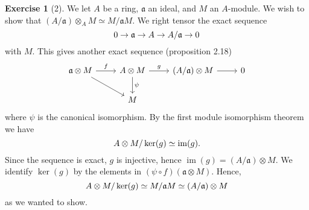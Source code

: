 \documentclass{article}
\theoremstyle{definition}
\newtheorem*{exercise}{Exercise}
\DeclareMathOperator{\im}{im}
\begin{document}
\begin{exercise}[2]
    We let $A$ be a ring, $\mathfrak{a}$ an ideal, and $M$ an $A$-module. We
    wish to show that $(A / \mathfrak{a}) \otimes_A M \simeq M /
    \mathfrak{a}M$. We right tensor the exact sequence
    \begin{equation}
        \notag
        0 \to \mathfrak{a} \to A \to A / \mathfrak{a} \to 0
    \end{equation}
    with $M$. This gives another exact sequence (proposition 2.18)
    \[
    \begin{tikzcd}
        \mathfrak{a} \otimes M \arrow{r}{f} \arrow{dr} & A \otimes M \arrow{r}{g} \arrow{d}{\psi} &(A / \mathfrak{a}) \otimes M \arrow{r} & 0 \\
        & M
    \end{tikzcd}
    \]
    where $\psi$ is the canonical isomorphism. By the first module isomorphism
    theorem we have
    \begin{equation}
        \notag
        A \otimes M / \ker(g) \simeq \im(g).
    \end{equation}
    Since the sequence is exact, $g$ is injective, hence $\im(g) = \left( A /
    \mathfrak{a} \right) \otimes M$. We identify $\ker(g)$ by the elements in
    $(\psi \circ f)(\mathfrak{a} \otimes M)$. Hence,
    \begin{equation}
        \notag
        A \otimes M / \ker(g) \simeq M / \mathfrak{a}M \simeq \left( A /
        \mathfrak{a} \right) \otimes M
    \end{equation}
    as we wanted to show.
\end{exercise}
\end{document}
